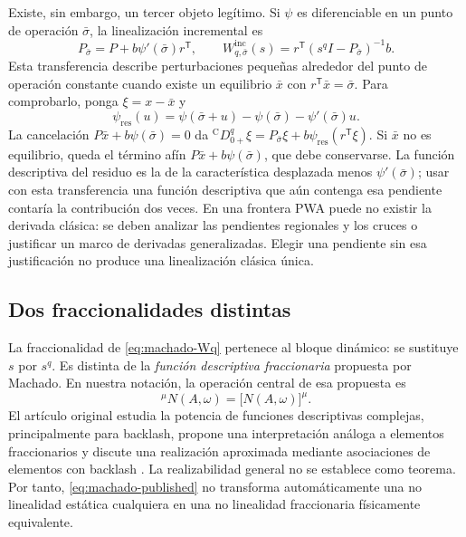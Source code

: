 Existe, sin embargo, un tercer objeto legítimo. Si \(\psi\) es diferenciable
en un punto de operación \(\bar\sigma\), la linealización incremental es
\begin{equation}
 P_{\bar\sigma}=P+b\psi'(\bar\sigma)r^{\mathsf T},
 \qquad
 W_{q,\bar\sigma}^{\mathrm{inc}}(s)
 =r^{\mathsf T}(s^qI-P_{\bar\sigma})^{-1}b.
 \label{eq:incremental-biased-transfer}
\end{equation}
Esta transferencia describe perturbaciones pequeñas alrededor del punto de
operación constante cuando existe un equilibrio \(\bar x\) con
\(r^{\mathsf T}\bar x=\bar\sigma\). Para comprobarlo, ponga
\(\xi=x-\bar x\) y
\[
 \psi_{\mathrm{res}}(u)
 =\psi(\bar\sigma+u)-\psi(\bar\sigma)-\psi'(\bar\sigma)u.
\]
La cancelación \(P\bar x+b\psi(\bar\sigma)=0\) da
\( {}^{\mathrm C}D_{0+}^{q}\xi
=P_{\bar\sigma}\xi+b\psi_{\mathrm{res}}(r^{\mathsf T}\xi)\).
Si \(\bar x\) no es equilibrio, queda el término afín
\(P\bar x+b\psi(\bar\sigma)\), que debe conservarse.
La función descriptiva del residuo es la de la característica desplazada
menos \(\psi'(\bar\sigma)\); usar con esta transferencia una función
descriptiva que aún contenga esa pendiente contaría la contribución dos veces.
En una frontera PWA puede no existir la derivada clásica: se deben
analizar las pendientes regionales y los cruces o justificar un marco
de derivadas generalizadas. Elegir una pendiente sin esa justificación
no produce una linealización clásica única.

\subsection{Dos fraccionalidades distintas}

La fraccionalidad de \cref{eq:machado-Wq} pertenece al bloque dinámico: se
sustituye \(s\) por \(s^q\). Es distinta de la
\emph{función descriptiva fraccionaria} propuesta por Machado. En nuestra
notación, la operación central de esa propuesta es
\begin{equation}
 {}^{\mu}\!N(A,\omega)
 =\bigl[N(A,\omega)\bigr]^\mu.
 \label{eq:machado-published}
\end{equation}
El artículo original estudia la potencia de funciones descriptivas complejas,
principalmente para backlash, propone una interpretación análoga a elementos
fraccionarios y discute una realización aproximada mediante asociaciones de
elementos con backlash \cite{Machado2015FDF}. La realizabilidad general no se
establece como teorema. Por tanto, \cref{eq:machado-published} no transforma
automáticamente una no linealidad estática cualquiera en una no linealidad
fraccionaria físicamente equivalente.

